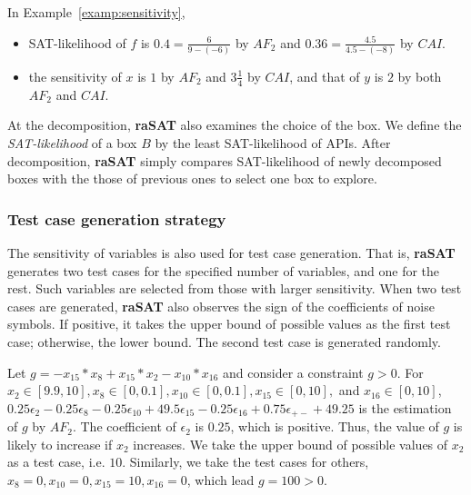 \documentclass[runningheads,a4paper,oribibl]{llncs}
\newcommand{\suppress}[1]{} %
\begin{document}
\begin{example} \label{examp:SATlikelihood}
In Example~\ref{examp:sensitivity}, 
\begin{itemize}
\item SAT-likelihood of $f$ is $0.4= \frac{6}{9-(-6)}$ by $AF_2$ 
and $0.36 = \frac{4.5}{4.5-(-8)}$ by $CAI$. 
\item the sensitivity of $x$ is $1$ by $AF_2$ and $3\frac{1}{4}$ by $CAI$,
  and that of $y$ is $2$ by both $AF_2$ and $CAI$. 
\end{itemize}
\end{example}


At the decomposition, {\bf raSAT} also examines the choice of the box.
We define the {\em SAT-likelihood} of a box $B$ by 
the least SAT-likelihood of APIs. After decomposition, {\bf raSAT} simply compares SAT-likelihood of newly decomposed boxes with the those of previous ones to select one box to explore.


\subsubsection*{Test case generation strategy}
\sloppy
The sensitivity of variables is also used for test case generation.
That is, {\bf raSAT} generates two test cases for the specified number of variables,
and one for the rest. 
Such variables are selected from those with larger sensitivity.
When two test cases are generated, {\bf raSAT} also observes
the sign of the coefficients of noise symbols.
If positive, it takes the upper bound of possible values as the first test case; 
otherwise, the lower bound. The second test case is generated randomly. 

\begin{example}
  Let $g = -x_{15}*x_8+x_{15}*x_2-x_{10}*x_{16}$ and consider a constraint $g > 0$. 
  For ${x_2 \in [9.9, 10]}, {x_8 \in [0, 0.1]}, {x_{10} \in [0, 0.1]}, {x_{15} \in [0, 10]},$ and
  $ x_{16} \in [0, 10]$, 
  ${0.25 \epsilon_2 - 0.25 \epsilon_8 - 0.25 \epsilon_{10} + 49.5\epsilon_{15} - 0.25\epsilon_{16}
    + 0.75\epsilon_{+-} + 49.25}$ is the estimation of $g$ by $AF_2$. 
  The coefficient of $\epsilon_2$ is $0.25$, which is positive. 
  Thus, the value of $g$ is likely to increase if $x_2$ increases. 
  We take the upper bound of possible values of $x_2$ as a test case, i.e. $10$. 
  Similarly, we take the test cases for others, $x_8=0, x_{10}=0, x_{15}=10, x_{16}=0$, which lead $g=100 > 0$. 
\end{example}
\suppress{
I. Selecting API for testing:
  (1) Difficulty first by SAT-likelihood.   
  (2) Easy first by SAT-likelihood
  (10) Random.,
II. Selecting Variable:
  (8) With sensitivity
  (9) Without sensitivity - Random: 
III. Selecting box:
  (3) SAT-directed using IA-testing.
  (4) UNSAT-directed using IA-testing.
  (5) SAT-directed using SAT-likelihood
  (6) UNSAT-directed using SAT-likelihood
  (7) Random
}
\end{document}
